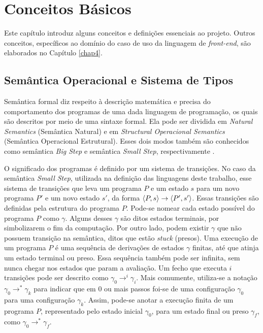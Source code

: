 \chapter{Conceitos Básicos} 
\label{chap2}

Este capítulo introduz alguns conceitos e definições essenciais ao projeto. 
Outros conceitos, específicos ao domínio do caso de uso da linguagem de \emph{front-end},
são elaborados no Capítulo \ref{chap4}. 

\section{Semântica Operacional e Sistema de Tipos}

Semântica formal diz respeito à descrição matemática e precisa do comportamento dos programas de uma dada linguagem de programação, os quais são descritos por meio de uma sintaxe formal. Ela pode ser dividida em \emph{Natural Semantics} (Semântica Natural) e em \emph{Structural Operacional Semantics} (Semântica Operacional Estrutural). Esses dois modos também são conhecidos como semântica \emph{Big Step} e semântica \emph{Small Step}, respectivamente \cite{NIELSON}.

O significado dos programas é definido por um sistema de transições. No caso da semântica \emph{Small Step}, utilizada na definição das linguagens deste trabalho, esse sistema de transições que leva um programa $P$ e um estado $s$ para um novo programa $P'$ e um novo estado $s'$, da forma $\langle P, s \rangle \to \langle P', s' \rangle$. Essas transições são definidas pela estrutura do programa $P$. Pode-se nomear cada estado possível do programa $P$ como $\gamma$. Alguns desses $\gamma$ são ditos estados terminais, por simbolizarem o fim da computação. Por outro lado, podem existir $\gamma$ que não possuem transição na semântica, ditos que estão \emph{stuck} (presos). Uma execução de um programa $P$ é uma sequência de derivações de estados $\gamma$ finitas, até que atinja um estado terminal ou preso. Essa sequência também pode ser infinita, sem nunca chegar nos estados que param a avaliação. Um fecho que executa $i$ transições pode ser descrito como $\gamma_0 \to^i \gamma_i$. Mais comumente, utiliza-se a notação $\gamma_0 \to^* \gamma_k$ para indicar que em 0 ou mais passos foi-se de uma configuração $\gamma_0$ para uma configuração $\gamma_k$. Assim, pode-se anotar a execução finita de um programa $P$, representado pelo estado inicial $\gamma_0$, para um estado final ou preso $\gamma_f$, como $\gamma_0 \to^* \gamma_f$.

